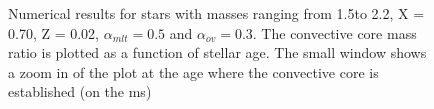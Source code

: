 \begin{figure}[htbp]
    \centering
    \caption{Numerical results for stars with masses ranging from 1.5\msun to 2.2\msun, X = 0.70, Z = 0.02, $\alpha_{mlt} = 0.5$ and $\alpha_{ov} = 0.3$. The convective core mass ratio is plotted as a function of stellar age. The small window shows a zoom in of the plot at the age where the convective core is established (on the ms)}
    \label{convcore}
\end{figure}





